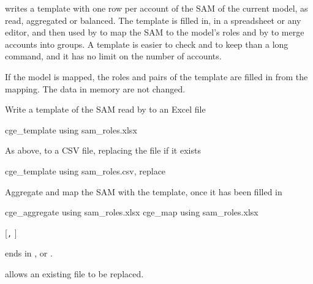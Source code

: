 

 writes a template with one row per account of the SAM of
the current model, as read, aggregated or balanced. The template is filled in,
in a spreadsheet or any editor, and then used by 
 to map the SAM to the model's roles and by
  to merge accounts into groups. A template is
easier to check and to keep than a long  command, and it has no
limit on the number of accounts.

If the model is mapped, the roles and pairs of the template are filled in from
the mapping. The data in memory are not changed.


Write a template of the SAM read by  to an Excel file
\begin{stcode}
cge_template using sam_roles.xlsx
\end{stcode}
As above, to a CSV file, replacing the file if it exists
\begin{stcode}
cge_template using sam_roles.csv, replace
\end{stcode}
Aggregate and map the SAM with the template, once it has been filled in
\begin{stcode}
cge_aggregate using sam_roles.xlsx
cge_map using sam_roles.xlsx
\end{stcode}


\begin{stsyntax}
   [\texttt{,} ]
\end{stsyntax}

 ends in ,  or .


\begin{optdesc}
\item[\opt{}{replace}] allows an existing file to be replaced.
\end{optdesc}



